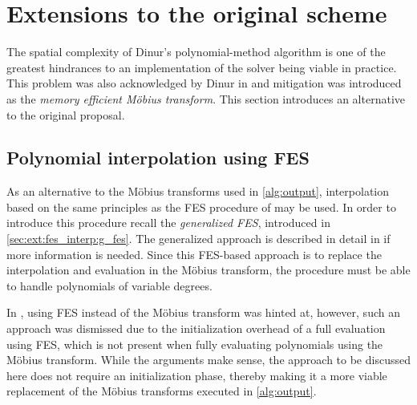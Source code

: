 \chapter{Extensions to the original scheme} \label{sec:ext}
The spatial complexity of Dinur's polynomial-method algorithm is one of the greatest hindrances to an implementation of the solver being viable in practice. This problem was also acknowledged by Dinur in \cite{eurocrypt-2021-30841} and mitigation was introduced as the \textit{memory efficient Möbius transform}. This section introduces an alternative to the original proposal.
 
\section{Polynomial interpolation using FES} \label{sec:ext:fes_interp}
As an alternative to the Möbius transforms used in \cref{alg:output}, interpolation based on the same principles as the FES procedure of \cite{ches-2010-23990} may be used. In order to introduce this procedure recall the \textit{generalized FES}, introduced in \cref{sec:ext:fes_interp:g_fes}. The generalized approach is described in detail in \cite{tungchoumasters} if more information is needed. Since this FES-based approach is to replace the interpolation and evaluation in the Möbius transform, the procedure must be able to handle polynomials of variable degrees.

In \cite{eurocrypt-2021-30841}, using FES instead of the Möbius transform was hinted at, however, such an approach was dismissed due to the initialization overhead of a full evaluation using FES, which is not present when fully evaluating polynomials using the Möbius transform. While the arguments make sense, the approach to be discussed here does not require an initialization phase, thereby making it a more viable replacement of the Möbius transforms executed in \cref{alg:output}.

